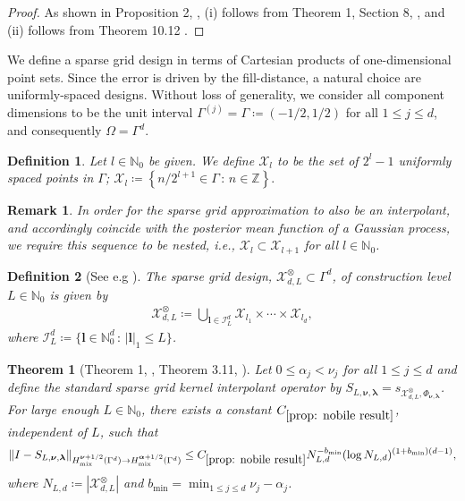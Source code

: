 \documentclass[pdflatex,sn-mathphys-num]{sn-jnl}%
\theoremstyle{thmstyleone}%
\newtheorem{theorem}{Theorem}%
\theoremstyle{thmstyletwo}%
\newtheorem{remark}{Remark}%
\theoremstyle{thmstylethree}%
\newtheorem{definition}{Definition}%
\begin{document}
\begin{proof}
As shown in Proposition 2, \cite{Nobile2018}, (i) follows from Theorem 1, Section 8, \cite{Aronszajn1950}, and (ii) follows from Theorem 10.12 \cite{wendland_2004}.
\end{proof}
We define a sparse grid design in terms of Cartesian products of one-dimensional point sets. Since the error is driven by the fill-distance, a natural choice are uniformly-spaced designs. Without loss of generality, we consider all component dimensions to be the unit interval \(\Gamma^{(j)}=\Gamma\coloneqq(-1/2, 1/2)\) for all \(1\leq j\leq d\), and consequently \(\Omega=\Gamma^d\).
\begin{definition}\label{def:chi_l}
Let \(l\in\mathbb{N}_0\) be given. We define \(\mathcal{X}_l\) to be the set of \(2^l-1\) uniformly spaced points in \(\Gamma\); \(\mathcal{X}_l \coloneqq\left\{n/2^{l+1}\in\Gamma\,:\,n\in\mathbb{Z}\right\}.\)
\end{definition}
\begin{remark}
    In order for the sparse grid approximation to also be an interpolant, and accordingly coincide with the posterior mean function of a Gaussian process, we require this sequence to be nested, i.e., \(\mathcal{X}_l\subset\mathcal{X}_{l+1}\) for all \(l\in\mathbb{N}_0\). 
\end{remark}
\begin{definition}[See e.g \cite{bungartz2004sparse}]\label{def: iso sparse grid}
    The \emph{sparse grid design}, \(\mathcal{X}^{\otimes}_{d,L}\subset\Gamma^d\), of \emph{construction level} \(L\in\mathbb{N}_0\) is given by
    \begin{align}
        \mathcal{X}_{d,L}^{\otimes}\coloneqq\bigcup_{\boldsymbol{l}\in\mathcal{I}_L^d}\mathcal{X}_{l_1}\times\cdots\times\mathcal{X}_{l_d},\nonumber
    \end{align}
    where \(\mathcal{I}_L^d\coloneqq\{\boldsymbol{l}\in\mathbb{N}_0^d\,:\,|\boldsymbol{l}|_1\leq L\}\).
\end{definition}
\begin{theorem}[Theorem 1, \cite{Nobile2018}, Theorem 3.11, \cite{Teckentrup2020}]\label{prop: nobile result}
    Let \(0\leq\alpha_j<\nu_j\) for all \(1\leq j\leq d\) and define the standard sparse grid kernel interpolant operator by
    \(S_{L,\boldsymbol{\nu},\boldsymbol{\lambda}}=s_{\mathcal{X}^{\otimes}_{d,L},\Phi_{\boldsymbol{\nu,\lambda}}}\). For large enough \(L\in\mathbb{N}_0\), there exists a constant \(C_{\ref{prop: nobile result}}\), independent of \(L\), such that
    \begin{align}
        \|I-S_{L,\boldsymbol{\nu},\boldsymbol{\lambda}}\|_{H^{\boldsymbol{\nu}+1/2}_{\textrm{mix}}(\Gamma^d)\rightarrow H^{\boldsymbol{\alpha}+1/2}_{\textrm{mix}}(\Gamma^d)}\leq C_{\ref{prop: nobile result}}N_{L,d}^{-b_{\min}}(\log N_{L,d})^{(1+b_{\min})(d-1)},
    \end{align}
    where \(N_{L, d}\coloneqq|\mathcal{X}^{\otimes}_{d,L}|\) and \(b_{\min}=\min_{1\leq j\leq d}\nu_j-\alpha_j\).
\end{theorem}
\end{document}
